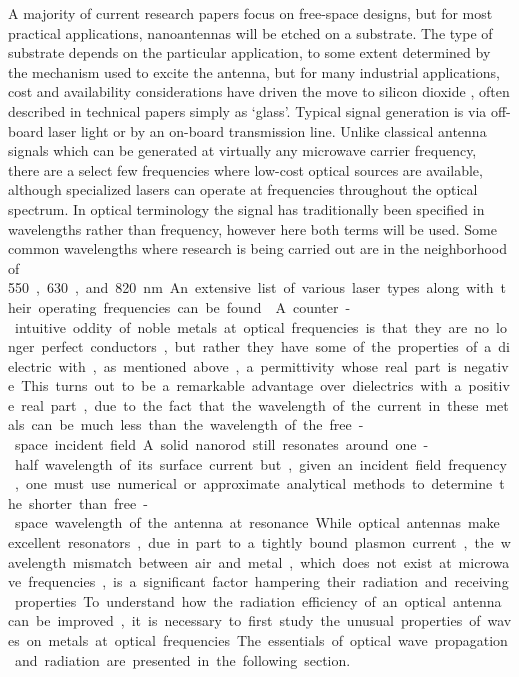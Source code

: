 \documentclass[11pt]{article}
\begin{document}
A majority of current research papers focus on free-space designs, but for most practical applications, nanoantennas will be etched on a substrate. The type of substrate depends on the particular application, to some extent determined by the mechanism used to excite the antenna, but for many industrial applications, cost and availability considerations have driven the move to silicon dioxide , often described in technical papers simply as `glass'. Typical signal generation is via off-board laser light or by an on-board transmission line. Unlike classical antenna signals which can be generated at virtually any microwave carrier frequency, there are a select few frequencies where low-cost optical sources are available, although specialized lasers can operate at frequencies throughout the optical spectrum. In optical terminology the signal has traditionally been specified in wavelengths rather than frequency, however here both terms will be used. Some common wavelengths where research is being carried out are in the neighborhood of
\SI{550}, \SI{630}, and \SI{820}{\nm}. An extensive list of various laser types along with their operating frequencies can be found \cite{Weber2000}.
%

A counter-intuitive oddity of noble metals at optical frequencies is that they are no longer perfect conductors, but rather they have some of the properties of a dielectric with, as mentioned above, a permittivity whose real part is negative. This turns out to be a remarkable advantage over dielectrics with a positive real part, due to the fact that the wavelength of the current in these metals can be much less than the wavelength of the free-space incident field. A solid nanorod still resonates around one-half wavelength of its surface current but, given an incident field frequency, one must use numerical or approximate analytical methods to determine the shorter than free-space wavelength of the antenna at resonance. While optical antennas make excellent resonators, due in part to a tightly bound plasmon current, the wavelength mismatch between air and metal, which does not exist at microwave frequencies, is a significant factor hampering their radiation and receiving properties. To understand how the radiation efficiency of an optical antenna can be improved, it is necessary to first study the unusual properties of waves on metals at optical frequencies. The essentials of optical wave propagation and radiation are presented in the following section.
\end{document}
